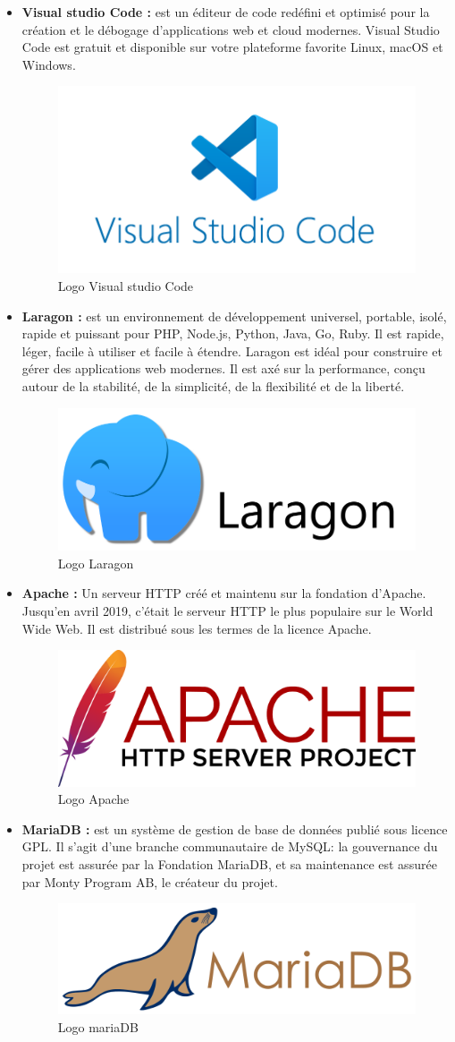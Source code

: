 \begin{itemize}
	\item \textbf{Visual studio Code\cite{vscode} :} est un éditeur de code redéfini et optimisé pour la création et le débogage d'applications web et cloud modernes.  Visual Studio Code est gratuit et disponible sur votre plateforme favorite Linux, macOS et Windows.
	\begin{figure}[H]
		\centering
		\includegraphics[width=0.3\linewidth]{img/logos/vscode}
		\caption[Logo Visual studio Code]{Logo Visual studio Code}
		\label{fig:vscode}
	\end{figure}
	\item \textbf{Laragon\cite{laragon} :} est un environnement de développement universel, portable, isolé, rapide et puissant pour PHP, Node.js, Python, Java, Go, Ruby. Il est rapide, léger, facile à utiliser et facile à étendre. Laragon est idéal pour construire et gérer des applications web modernes. Il est axé sur la performance, conçu autour de la stabilité, de la simplicité, de la flexibilité et de la liberté.
	\begin{figure}[H]
		\centering
		\includegraphics[width=0.3\linewidth]{img/logos/laragon}
		\caption[Logo Laragon]{Logo Laragon}
		\label{fig:laragon}
	\end{figure}
	\item \textbf{Apache\cite{apache} :} Un serveur HTTP créé et maintenu sur la fondation d'Apache. Jusqu'en avril 2019, c'était le serveur HTTP le plus populaire sur le World Wide Web. Il est distribué sous les termes de la licence Apache.
	\begin{figure}[H]
		\centering
		\includegraphics[width=0.3\linewidth]{img/logos/apache}
		\caption[Logo Apache]{Logo Apache}
		\label{fig:apache}
	\end{figure}
	
	\item \textbf{MariaDB\cite{mariadb} :} est un système de gestion de base de données publié sous licence GPL. Il s'agit d'une branche communautaire de MySQL: la gouvernance du projet est assurée par la Fondation MariaDB, et sa maintenance est assurée par Monty Program AB, le créateur du projet.
	\begin{figure}[H]
		\centering
		\includegraphics[width=0.3\linewidth]{img/logos/mariadb}
		\caption[Logo MariaDB]{Logo mariaDB}
		\label{fig:mariadb}
	\end{figure}
	

\end{itemize}

